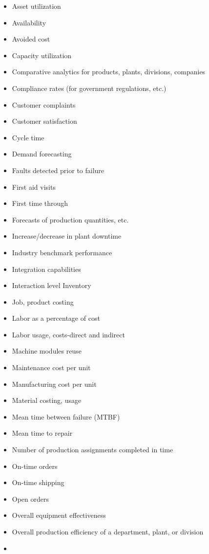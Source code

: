 \documentclass[]{book}
\providecommand{\tightlist}{%
  \setlength{\itemsep}{0pt}\setlength{\parskip}{0pt}}
\begin{document}
\begin{itemize}
\tightlist
\item
  Asset utilization
\item
  Availability
\item
  Avoided cost
\item
  Capacity utilization
\item
  Comparative analytics for products, plants, divisions, companies
\item
  Compliance rates (for government regulations, etc.)
\item
  Customer complaints
\item
  Customer satisfaction
\item
  Cycle time
\item
  Demand forecasting
\item
  Faults detected prior to failure
\item
  First aid visits
\item
  First time through
\item
  Forecasts of production quantities, etc.
\item
  Increase/decrease in plant downtime
\item
  Industry benchmark performance
\item
  Integration capabilities
\item
  Interaction level Inventory
\item
  Job, product costing
\item
  Labor as a percentage of cost
\item
  Labor usage, costs-direct and indirect
\item
  Machine modules reuse
\item
  Maintenance cost per unit
\item
  Manufacturing cost per unit
\item
  Material costing, usage
\item
  Mean time between failure (MTBF)
\item
  Mean time to repair
\item
  Number of production assignments completed in time
\item
  On-time orders
\item
  On-time shipping
\item
  Open orders
\item
  Overall equipment effectiveness
\item
  Overall production efficiency of a department, plant, or division
\item

\end{itemize}
\end{document}
